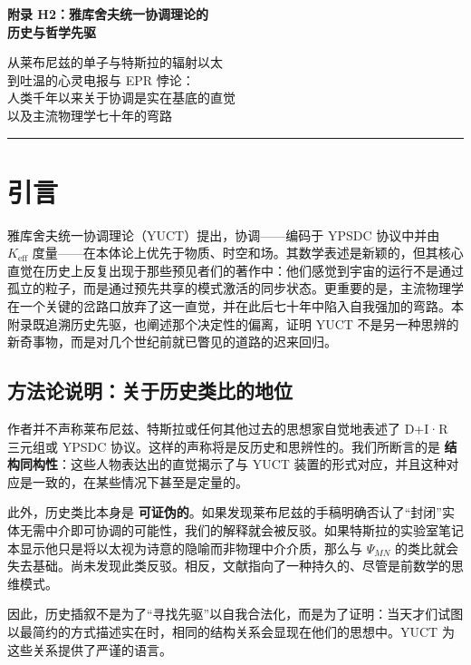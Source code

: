 \documentclass[12pt,a4paper]{article}
\def\goldline{\noindent\textcolor{gold}{\rule{\textwidth}{1.6pt}}}
\begin{document}
	
	\thispagestyle{fancyfirst}
	\vspace*{1cm}
	
	\begin{center}
		{\fontsize{28}{32}\selectfont\bfseries\color{darkblue} 附录 H2：雅库舍夫统一协调理论的\\历史与哲学先驱}
		
		\vspace{1cm}
		\large
		从莱布尼兹的单子与特斯拉的辐射以太\\
		到吐温的心灵电报与 EPR 悖论：\\
		人类千年以来关于协调是实在基底的直觉\\
		以及主流物理学七十年的弯路
	\end{center}
	
	\vspace{1.5cm}
	\goldline
	
	\section{引言}
	
	雅库舍夫统一协调理论（YUCT）提出，协调——编码于 YPSDC 协议中并由 \(K_{\mathrm{eff}}\) 度量——在本体论上优先于物质、时空和场。其数学表述是新颖的，但其核心直觉在历史上反复出现于那些预见者们的著作中：他们感觉到宇宙的运行不是通过孤立的粒子，而是通过预先共享的模式激活的同步状态。更重要的是，主流物理学在一个关键的岔路口放弃了这一直觉，并在此后七十年中陷入自我强加的弯路。本附录既追溯历史先驱，也阐述那个决定性的偏离，证明 YUCT 不是另一种思辨的新奇事物，而是对几个世纪前就已瞥见的道路的迟来回归。
	
	\subsection{方法论说明：关于历史类比的地位}
	\label{subsec:methodological-note}
	
	作者并不声称莱布尼兹、特斯拉或任何其他过去的思想家自觉地表述了 D+I·R 三元组或 YPSDC 协议。这样的声称将是反历史和思辨性的。我们所断言的是 \textbf{结构同构性}：这些人物表达出的直觉揭示了与 YUCT 装置的形式对应，并且这种对应是一致的，在某些情况下甚至是定量的。
	
	此外，历史类比本身是 \textbf{可证伪的}。如果发现莱布尼兹的手稿明确否认了“封闭”实体无需中介即可协调的可能性，我们的解释就会被反驳。如果特斯拉的实验室笔记本显示他只是将以太视为诗意的隐喻而非物理中介介质，那么与 \(\Psi_{MN}\) 的类比就会失去基础。尚未发现此类反驳。相反，文献指向了一种持久的、尽管是前数学的思维模式。
	
	因此，历史插叙不是为了“寻找先驱”以自我合法化，而是为了证明：当天才们试图以最简约的方式描述实在时，相同的结构关系会显现在他们的思想中。YUCT 为这些关系提供了严谨的语言。
	
\end{document}
